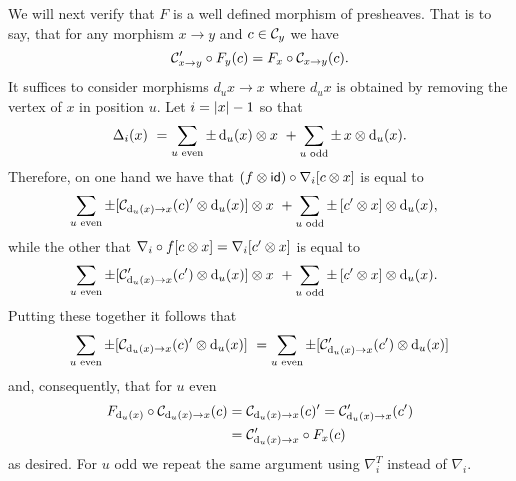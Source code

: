 We will next verify that $F$ is a well defined morphism of presheaves.
That is to say, that for any morphism $x \to y$ and $c \in \mathcal{C}_y$ we have
\[
\mathcal{C}'_{x \to y} \circ F_y(c) = F_x \circ \mathcal{C}_{x \to y}(c).
\]
It suffices to consider morphisms $d_u x \to x$ where $d_u x$ is obtained by removing the vertex of $x$ in position $u$.
Let $i = \lvert x\rvert-1$ so that
\[
\Delta_i(x) \ =
\sum_{u \text{ even}} \pm \operatorname{d}_u(x) \otimes x \ +
\sum_{u \text{ odd}} \pm \, x \otimes \operatorname{d}_u(x).
\]
Therefore, on one hand we have that $(f \otimes \mathsf{id}) \circ \nabla_i [c \otimes x]$ is equal to
\begin{align*}
	&\sum_{u \text{ even}} \pm [\mathcal{C}_{\operatorname{d}_u(x) \to x}(c)' \otimes \operatorname{d}_u(x)] \otimes x \ +
	\sum_{u \text{ odd}} \pm \, [c' \otimes x] \otimes \operatorname{d}_u(x),
\end{align*}
while the other that $\nabla_i \circ f [c \otimes x] = \nabla_i [c' \otimes x]$ is equal to
\begin{align*}
	&\sum_{u \text{ even}} \pm [\mathcal{C}'_{\operatorname{d}_u(x) \to x}(c') \otimes \operatorname{d}_u(x)] \otimes x \ +
	\sum_{u \text{ odd}} \pm \, [c' \otimes x] \otimes \operatorname{d}_u(x).
\end{align*}
Putting these together it follows that
\[
\sum_{u \text{ even}} \pm [\mathcal{C}_{\operatorname{d}_u(x) \to x}(c)' \otimes \operatorname{d}_u(x)] \ =
\sum_{u \text{ even}} \pm [\mathcal{C}'_{\operatorname{d}_u(x) \to x}(c') \otimes \operatorname{d}_u(x)]
\]
and, consequently, that for $u$ even
\begin{align*}
	F_{\operatorname{d}_u(x)} \circ \mathcal{C}_{\operatorname{d}_u(x) \to x}(c) &=
	\mathcal{C}_{\operatorname{d}_u(x) \to x}(c)' =
	\mathcal{C}'_{\operatorname{d}_u(x) \to x}(c') \\ &=
	\mathcal{C}'_{\operatorname{d}_u(x) \to x} \circ F_{x}(c)
\end{align*}
as desired.
For $u$ odd we repeat the same argument using $\nabla_i^T$ instead of $\nabla_i$.
